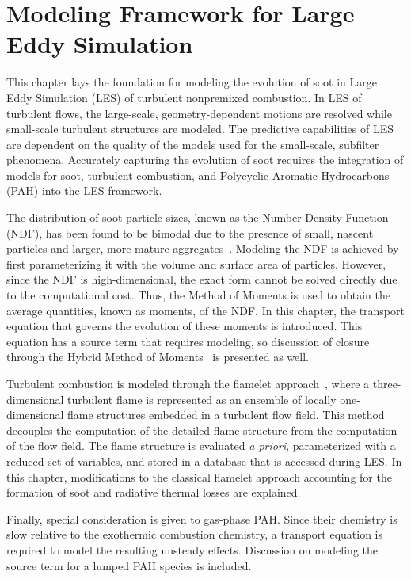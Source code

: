 \chapter{Modeling Framework for Large Eddy Simulation\label{ch:lesmodels}}

This chapter lays the foundation for modeling the evolution of soot in Large Eddy Simulation (LES) of turbulent nonpremixed combustion. In LES of turbulent flows, the large-scale, geometry-dependent motions are resolved while small-scale turbulent structures are modeled. The predictive capabilities of LES are dependent on the quality of the models used for the small-scale, subfilter phenomena. Accurately capturing the evolution of soot requires the integration of models for soot, turbulent combustion, and Polycyclic Aromatic Hydrocarbons (PAH) into the LES framework.

The distribution of soot particle sizes, known as the Number Density Function (NDF), has been found to be bimodal due to the presence of small, nascent particles and larger, more mature aggregates~\cite{zhao2003,zhao2005,netzell2007}. Modeling the NDF is achieved by first parameterizing it with the volume and surface area of particles. However, since the NDF is high-dimensional, the exact form cannot be solved directly due to the computational cost. Thus, the Method of Moments is used to obtain the average quantities, known as moments, of the NDF. In this chapter, the transport equation that governs the evolution of these moments is introduced. This equation has a source term that requires modeling, so discussion of closure through the Hybrid Method of Moments~\cite{hmom2009} is presented as well.

Turbulent combustion is modeled through the flamelet approach~\cite{peters1984}, where a three-dimensional turbulent flame is represented as an ensemble of locally one-dimensional flame structures embedded in a turbulent flow field. This method decouples the computation of the detailed flame structure from the computation of the flow field. The flame structure is evaluated \textit{a priori}, parameterized with a reduced set of variables, and stored in a database that is accessed during LES. In this chapter, modifications to the classical flamelet approach accounting for the formation of soot and radiative thermal losses are explained. %

Finally, special consideration is given to gas-phase PAH. Since their chemistry is slow relative to the exothermic combustion chemistry, a transport equation is required to model the resulting unsteady effects. Discussion on modeling the source term for a lumped PAH species is included.

